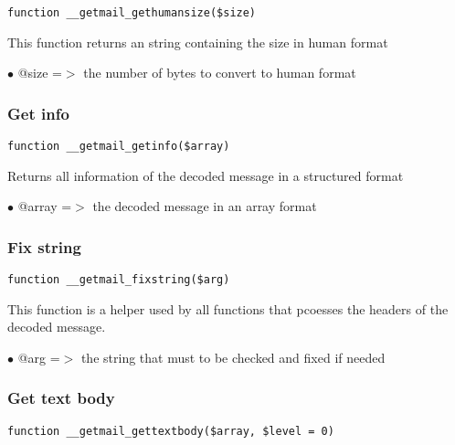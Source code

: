 \documentclass[a4paper]{article}
\begin{document}
\begin{lstlisting}
function __getmail_gethumansize($size)
\end{lstlisting}

This function returns an string containing the size in human format

\begin{compactitem}
\item[\color{myblue}$\bullet$] @size =$>$ the number of bytes to convert to human format
\end{compactitem}

\hypertarget{toc45}{}
\subsubsection{Get info}

\begin{lstlisting}
function __getmail_getinfo($array)
\end{lstlisting}

Returns all information of the decoded message in a structured format

\begin{compactitem}
\item[\color{myblue}$\bullet$] @array =$>$ the decoded message in an array format
\end{compactitem}

\hypertarget{toc46}{}
\subsubsection{Fix string}

\begin{lstlisting}
function __getmail_fixstring($arg)
\end{lstlisting}

This function is a helper used by all functions that pcoesses the headers
of the decoded message.

\begin{compactitem}
\item[\color{myblue}$\bullet$] @arg =$>$ the string that must to be checked and fixed if needed
\end{compactitem}

\hypertarget{toc47}{}
\subsubsection{Get text body}

\begin{lstlisting}
function __getmail_gettextbody($array, $level = 0)
\end{lstlisting}
\end{document}

